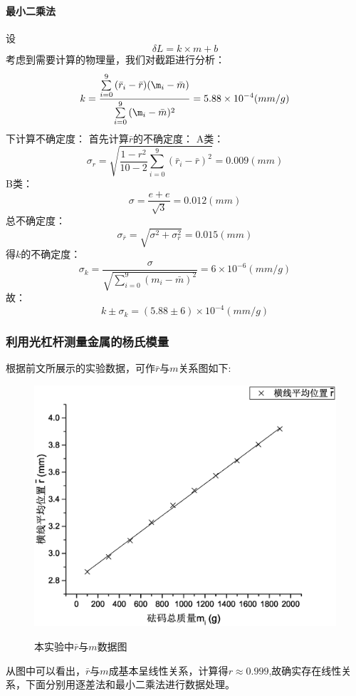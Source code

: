 \documentclass{ctexart}
\begin{document}
\paragraph{最小二乘法}
设$$\delta L=k\times m+b$$
考虑到需要计算的物理量，我们对截距进行分析：
$$k=\frac{\sum\limits_{i=0}^9{(\bar{r}_i-\bar{r})(\m_i-\bar{m})}}{\sum\limits_{i=0}^9{(\m_i-\bar{m})^2}}=5.88\times 10^{-4}(mm/g)$$
下计算不确定度：
首先计算$\bar{r}$的不确定度：
A类：$$\sigma_r =\sqrt{\frac{1-r^2}{10-2}\sum\limits_{i=0}^9{(\bar{r}_i-\bar{r})^2}}=0.009(mm)$$
B类：$$\sigma=\frac{e+e}{\sqrt{3}}=0.012(mm)$$
总不确定度：$$\sigma_{\bar{r}}=\sqrt{\sigma^2+\sigma_r^2}=0.015(mm)$$
得$k$的不确定度：
$$\sigma_k=\frac{\sigma}{\sqrt{\sum\limits_{i=0}^9{(m_i-\bar{m})^2}}}=6\times10^{-6}(mm/g)$$
故：
$$k\pm \sigma_k=(5.88\pm 6  )\times 10^{-4}(mm/g)$$
\subsubsection{利用光杠杆测量金属的杨氏模量}
根据前文所展示的实验数据，可作$\bar{r}$与$m$关系图如下:
\begin{figure}[H]
  \centering
  \caption{本实验中$\bar{r}$与$m$数据图}
  \includegraphics[width=\textwidth]{1}
  \label{fig:digit}
\end{figure}
从图中可以看出，$\bar{r}$与$m$成基本呈线性关系，计算得$r\approx 0.999$,故确实存在线性关系，下面分别用逐差法和最小二乘法进行数据处理。
\end{document}
